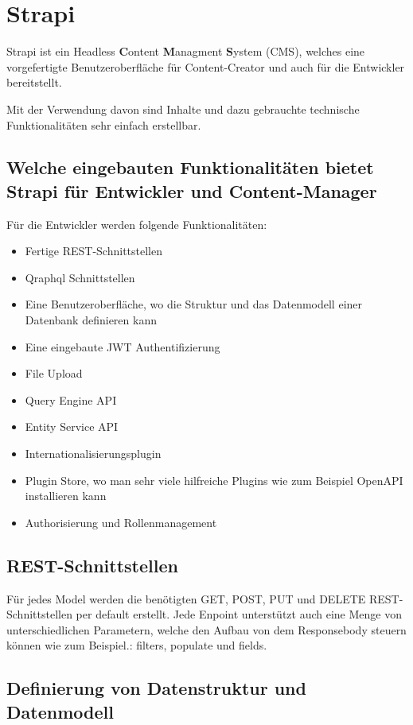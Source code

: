 \section{Strapi}
Strapi ist ein Headless \textbf{C}ontent \textbf{M}anagment \textbf{S}ystem (CMS),
welches eine vorgefertigte Benutzeroberfläche für Content-Creator
und auch für die Entwickler bereitstellt.

Mit der Verwendung davon sind Inhalte und dazu gebrauchte technische Funktionalitäten
sehr einfach erstellbar.
\cite{strapi-vs-wordpress}


\subsection*{Welche eingebauten Funktionalitäten bietet Strapi für Entwickler und Content-Manager}


Für die Entwickler werden folgende Funktionalitäten:

\begin{itemize}
    \item Fertige REST-Schnittstellen
    \item Qraphql Schnittstellen
    \item Eine Benutzeroberfläche, wo die Struktur und das Datenmodell einer Datenbank definieren kann
    \item Eine eingebaute JWT Authentifizierung
    \item File Upload
    \item Query Engine API
    \item Entity Service API
    \item Internationalisierungsplugin
    \item Plugin Store, wo man sehr viele hilfreiche Plugins wie zum Beispiel OpenAPI installieren kann
    \item Authorisierung und Rollenmanagement
\end{itemize}

\subsection{REST-Schnittstellen}
Für jedes Model werden die benötigten GET, POST, PUT und DELETE REST-Schnittstellen per default erstellt.
Jede Enpoint unterstützt auch eine Menge von unterschiedlichen Parametern, welche den Aufbau von dem Responsebody steuern können wie zum Beispiel.: filters, populate  und fields.
\cite{rest-query-parameters}
\subsection{Definierung von Datenstruktur und Datenmodell}

